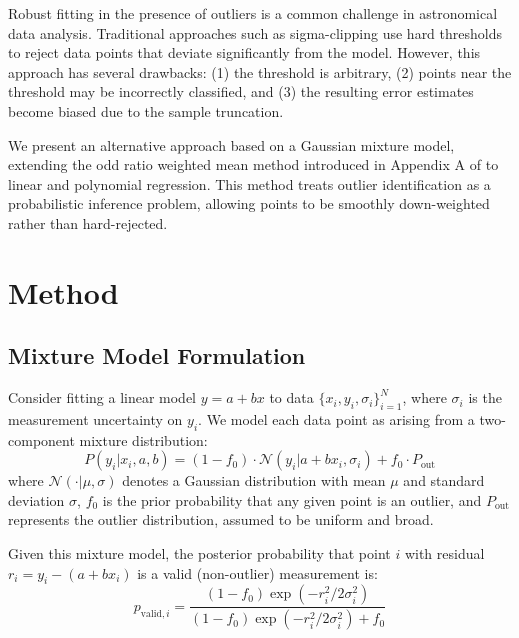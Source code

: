 \documentclass[twocolumn]{aastex631}
\begin{document}
Robust fitting in the presence of outliers is a common challenge in astronomical
data analysis. Traditional approaches such as sigma-clipping use hard thresholds
to reject data points that deviate significantly from the model. However, this
approach has several drawbacks: (1) the threshold is arbitrary, (2) points near
the threshold may be incorrectly classified, and (3) the resulting error estimates
become biased due to the sample truncation.

We present an alternative approach based on a Gaussian mixture model, extending
the odd ratio weighted mean method introduced in Appendix A of \citet{Artigau2022}
to linear and polynomial regression. This method treats outlier identification as
a probabilistic inference problem, allowing points to be smoothly down-weighted
rather than hard-rejected.


\section{Method}
\label{sec:method}

\subsection{Mixture Model Formulation}
\label{sec:mixture}

Consider fitting a linear model $y = a + bx$ to data $\{x_i, y_i, \sigma_i\}_{i=1}^N$,
where $\sigma_i$ is the measurement uncertainty on $y_i$. We model each data point
as arising from a two-component mixture distribution:
\begin{equation}
    P(y_i | x_i, a, b) = (1-f_0) \cdot \mathcal{N}(y_i | a+bx_i, \sigma_i) + f_0 \cdot P_{\mathrm{out}}
    \label{eq:mixture}
\end{equation}
where $\mathcal{N}(\cdot|\mu,\sigma)$ denotes a Gaussian distribution with mean $\mu$
and standard deviation $\sigma$, $f_0$ is the prior probability that any given point
is an outlier, and $P_{\mathrm{out}}$ represents the outlier distribution, assumed to
be uniform and broad.

Given this mixture model, the posterior probability that point $i$ with residual
$r_i = y_i - (a + bx_i)$ is a valid (non-outlier) measurement is:
\begin{equation}
    p_{\mathrm{valid},i} = \frac{(1-f_0) \exp\left(-r_i^2/2\sigma_i^2\right)}
        {(1-f_0) \exp\left(-r_i^2/2\sigma_i^2\right) + f_0}
    \label{eq:pvalid}
\end{equation}
\end{document}
